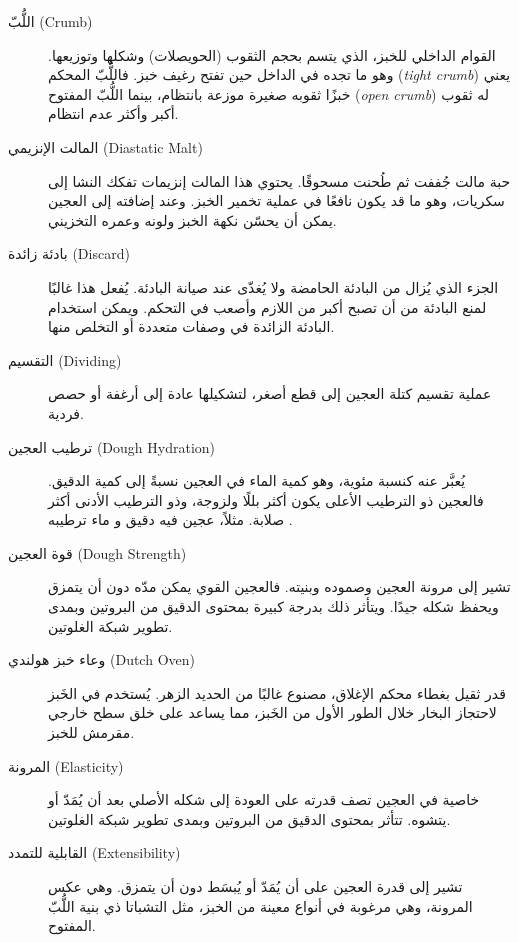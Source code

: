 \begin{description}
\item[اللُّبّ \textenglish{(Crumb)}]
القوام الداخلي للخبز، الذي يتسم بحجم الثقوب (الحويصلات) وشكلها وتوزيعها. وهو ما تجده في الداخل حين تفتح رغيف خبز. فاللُّبّ المحكم \textenglish{(\emph{tight crumb})} يعني خبزًا ثقوبه صغيرة موزعة بانتظام، بينما اللُّبّ المفتوح \textenglish{(\emph{open crumb})} له ثقوب أكبر وأكثر عدم انتظام.

\item[المالت الإنزيمي \textenglish{(Diastatic Malt)}]
حبة مالت جُففت ثم طُحنت مسحوقًا. يحتوي هذا المالت إنزيمات تفكك النشا إلى سكريات، وهو ما قد يكون نافعًا في عملية تخمير الخبز. وعند إضافته إلى العجين يمكن أن يحسّن نكهة الخبز ولونه وعمره التخزيني.

\item[بادئة زائدة \textenglish{(Discard)}]
الجزء الذي يُزال من البادئة الحامضة ولا يُغذّى عند صيانة البادئة. يُفعل هذا غالبًا لمنع البادئة من أن تصبح أكبر من اللازم وأصعب في التحكم. ويمكن استخدام البادئة الزائدة في وصفات متعددة أو التخلص منها.

\item[التقسيم \textenglish{(Dividing)}]
عملية تقسيم كتلة العجين إلى قطع أصغر، لتشكيلها عادة إلى أرغفة أو حصص فردية.

\item[ترطيب العجين \textenglish{(Dough Hydration)}]
يُعبَّر عنه كنسبة مئوية، وهو كمية الماء في العجين نسبةً إلى كمية الدقيق. فالعجين ذو الترطيب الأعلى يكون أكثر بللًا ولزوجة، وذو الترطيب الأدنى أكثر صلابة. مثلاً، عجين فيه  دقيق و ماء ترطيبه .

\item[قوة العجين \textenglish{(Dough Strength)}]
تشير إلى مرونة العجين وصموده وبنيته. فالعجين القوي يمكن مدّه دون أن يتمزق ويحفظ شكله جيدًا. ويتأثر ذلك بدرجة كبيرة بمحتوى الدقيق من البروتين وبمدى تطوير شبكة الغلوتين.

\item[وعاء خبز هولندي \textenglish{(Dutch Oven)}]
قدر ثقيل بغطاء محكم الإغلاق، مصنوع غالبًا من الحديد الزهر. يُستخدم في الخَبز لاحتجاز البخار خلال الطور الأول من الخَبز، مما يساعد على خلق سطح خارجي مقرمش للخبز.

\item[المرونة \textenglish{(Elasticity)}]
خاصية في العجين تصف قدرته على العودة إلى شكله الأصلي بعد أن يُمَدّ أو يتشوه. تتأثر بمحتوى الدقيق من البروتين وبمدى تطوير شبكة الغلوتين.

\item[القابلية للتمدد \textenglish{(Extensibility)}]
تشير إلى قدرة العجين على أن يُمَدّ أو يُبسَط دون أن يتمزق. وهي عكس المرونة، وهي مرغوبة في أنواع معينة من الخبز، مثل التشباتا ذي بنية اللُّبّ المفتوح.


\end{description}
